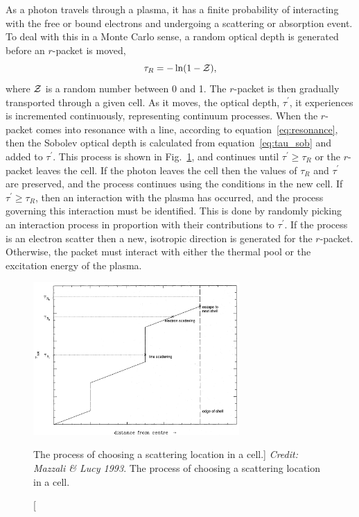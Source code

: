 \label{sec:rt_procedure}

As a photon travels through a plasma, it has a finite probability
of interacting with the free or bound electrons and undergoing a scattering
or absorption event. To deal with this in a Monte Carlo sense, a random optical 
depth is generated before an $r$-packet is moved,
\begin{equation}
\tau_R = - \ln (1 - {\cal Z}),
\end{equation}
where ${\cal Z}$ is a random number between 0 and 1. 
The $r$-packet is then gradually transported through a given cell. 
As it moves, the optical depth, $\tau^\prime$, it experiences
is incremented continuously, representing continuum processes. When the $r$-packet comes
into resonance with a line, according to equation~\ref{eq:resonance}, then
the Sobolev optical depth is calculated from equation~\ref{eq:tau_sob} and added to 
$\tau^\prime$. This process is shown in Fig.~\ref{fig:scatter_ml93}, and
continues until $\tau^\prime \geq \tau_R$ or the $r$-packet leaves the cell. If the
photon leaves the cell then the values of $\tau_R$ and $\tau^\prime$ are preserved,
and the process continues using the conditions in the new cell. If 
$\tau^\prime \geq \tau_R$, then an interaction with the plasma has occurred, and
the process governing this interaction must be identified. This is done by
randomly picking an interaction process in proportion with their contributions
to $\tau^\prime$. If the process is an electron scatter then a new, isotropic
direction is generated for the $r$-packet. Otherwise, the packet must
interact with either the thermal pool or the excitation energy of the plasma.

\begin{figure}
\centering
\includegraphics[width=0.7\textwidth]{figures/03-radtrans/tau_scat.png}
\caption
[The process of choosing a scattering location in a cell.]
{
{\sl Credit: Mazzali \& Lucy 1993}. 
The process of choosing a scattering location in a cell.
} 
\label{fig:scatter_ml93}
\end{figure}

